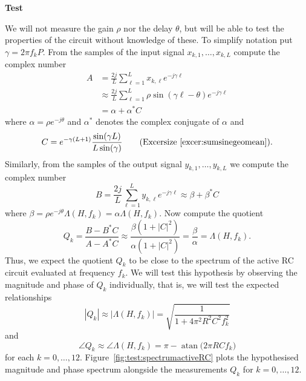 \documentclass[11pt,a4paper]{book}
\theoremstyle{plain}
\numberwithin{equation}{section}
\newcommand{\atan}[1]{\operatorname{atan}}
\newcommand{\abs}[1]{\left\vert #1 \right\vert}
\newcounter{test}
\newenvironment{test}{
\begin{shaded}\refstepcounter{test}\par\noindent%
\textbf{Test \thetest}
}{
\end{shaded}
}
\begin{document}
\begin{test}
We will not measure the gain $\rho$ nor the delay $\theta$, but will be able to test the properties of the circuit without knowledge of these.  To simplify notation put $\gamma = 2\pi f_k P$.  From the samples of the input signal $x_{k,1},\dots,x_{k,L}$ compute the complex number
\begin{align*}
A &= \frac{2j}{L}\sum_{\ell=1}^{L} x_{k,\ell} e^{-j \gamma \ell} \\
&\approx \frac{2j}{L}\sum_{\ell=1}^{L} \rho \sin( \gamma \ell - \theta)  e^{-j \gamma \ell} \\
&= \alpha + \alpha^* C
\end{align*}
where $\alpha = \rho e^{- j \theta}$ and $\alpha^*$ denotes the complex conjugate of $\alpha$ and
\[
C = e^{-\gamma (L+1)} \frac{  \sin( \gamma L)  }{L \sin(\gamma)  } \qquad \text{(Excersize~\ref{excer:sumsinegeomean})} .
\]
Similarly, from the samples of the output signal $y_{k,1},\dots,y_{k,L}$ we compute the complex number
\[
B = \frac{2j}{L}\sum_{\ell=1}^{L} y_{k,\ell} e^{-j \gamma\ell} \approx \beta + \beta^*C
\]
where $\beta = \rho  e^{-j\theta} \Lambda(H,f_k) = \alpha \Lambda(H,f_k)$.  Now compute the quotient
\[
Q_k = \frac{B - B^* C}{A - A^* C} \approx \frac{\beta (1 + \abs{C}^2)}{\alpha (1 + \abs{C}^2)} = \frac{\beta}{\alpha} = \Lambda(H,f_k).
\]
Thus, we expect the quotient $Q_k$ to be close to the spectrum of the active RC circuit evaluated at frequency $f_k$.  We will test this hypothesis by observing the magnitude and phase of $Q_k$ individually, that is, we will test the expected relationships
\[
\abs{Q_k} \approx \abs{\Lambda(H,f_k)} = \sqrt{\frac{1}{1 + 4\pi^2 R^2 C^2 f_k^2}}
\]
and
\[
\angle Q_k \approx \angle \Lambda(H,f_k) = \pi - \atan\big( 2\pi R C f_k \big)
\]
for each $k = 0,\dots,12$.  Figure~\ref{fig:test:spectrumactiveRC} plots the hypothesised magnitude and phase spectrum alongside the measurements $Q_k$ for $k = 0, \dots, 12$.

\end{test}
\end{document}
